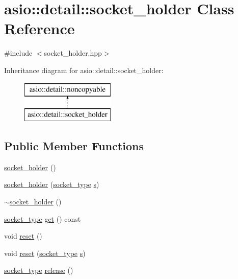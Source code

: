 \hypertarget{classasio_1_1detail_1_1socket__holder}{}\section{asio\+:\+:detail\+:\+:socket\+\_\+holder Class Reference}
\label{classasio_1_1detail_1_1socket__holder}


{\ttfamily \#include $<$socket\+\_\+holder.\+hpp$>$}

Inheritance diagram for asio\+:\+:detail\+:\+:socket\+\_\+holder\+:\begin{figure}[H]
\begin{center}
\leavevmode
\includegraphics[height=2.000000cm]{classasio_1_1detail_1_1socket__holder}
\end{center}
\end{figure}
\subsection*{Public Member Functions}
\begin{DoxyCompactItemize}
\item 
\hyperlink{classasio_1_1detail_1_1socket__holder_a583c364271fa74a8292ec472009b1f40}{socket\+\_\+holder} ()
\item 
\hyperlink{classasio_1_1detail_1_1socket__holder_aecdb304341764151be2fee5d4548b7f1}{socket\+\_\+holder} (\hyperlink{namespaceasio_1_1detail_a6798c771dd84b79798b1a08150706ea9}{socket\+\_\+type} \hyperlink{group__async__connect_ga31ab74b9ea6c77932dddd016cfc7920a}{s})
\item 
\hyperlink{classasio_1_1detail_1_1socket__holder_ac20e117ae3baf80cce93c4deef2af2c5}{$\sim$socket\+\_\+holder} ()
\item 
\hyperlink{namespaceasio_1_1detail_a6798c771dd84b79798b1a08150706ea9}{socket\+\_\+type} \hyperlink{classasio_1_1detail_1_1socket__holder_acce8183ec40b137b333b0818724f750c}{get} () const 
\item 
void \hyperlink{classasio_1_1detail_1_1socket__holder_a769000b0737ed610487ac9f490e77519}{reset} ()
\item 
void \hyperlink{classasio_1_1detail_1_1socket__holder_ad025c1aacfd7186cf7a91cef7192b057}{reset} (\hyperlink{namespaceasio_1_1detail_a6798c771dd84b79798b1a08150706ea9}{socket\+\_\+type} \hyperlink{group__async__connect_ga31ab74b9ea6c77932dddd016cfc7920a}{s})
\item 
\hyperlink{namespaceasio_1_1detail_a6798c771dd84b79798b1a08150706ea9}{socket\+\_\+type} \hyperlink{classasio_1_1detail_1_1socket__holder_a319df4e1320692ff28e71b9601a42a8a}{release} ()
\end{DoxyCompactItemize}


